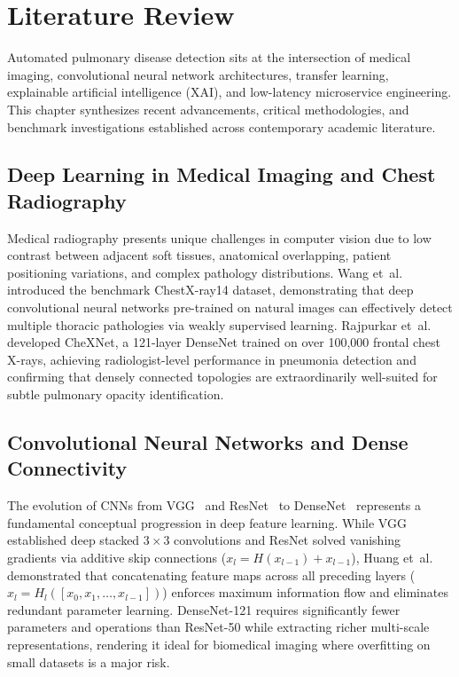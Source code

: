 \documentclass[12pt,a4paper]{report}
\begin{document}
\chapter{Literature Review}

Automated pulmonary disease detection sits at the intersection of medical imaging, convolutional neural network architectures, transfer learning, explainable artificial intelligence (XAI), and low-latency microservice engineering. This chapter synthesizes recent advancements, critical methodologies, and benchmark investigations established across contemporary academic literature.

\section{Deep Learning in Medical Imaging and Chest Radiography}
Medical radiography presents unique challenges in computer vision due to low contrast between adjacent soft tissues, anatomical overlapping, patient positioning variations, and complex pathology distributions. Wang et~al.~\cite{ref_wang2017_chestxray14} introduced the benchmark ChestX-ray14 dataset, demonstrating that deep convolutional neural networks pre-trained on natural images can effectively detect multiple thoracic pathologies via weakly supervised learning. Rajpurkar et~al.~\cite{ref_rajpurkar2017_chexnet} developed CheXNet, a 121-layer DenseNet trained on over 100,000 frontal chest X-rays, achieving radiologist-level performance in pneumonia detection and confirming that densely connected topologies are extraordinarily well-suited for subtle pulmonary opacity identification.

\section{Convolutional Neural Networks and Dense Connectivity}
The evolution of CNNs from VGG~\cite{ref_simonyan2014_vgg} and ResNet~\cite{ref_he2016_resnet} to DenseNet~\cite{ref_huang2017_densenet} represents a fundamental conceptual progression in deep feature learning. While VGG established deep stacked $3\times 3$ convolutions and ResNet solved vanishing gradients via additive skip connections ($x_l = H(x_{l-1}) + x_{l-1}$), Huang et~al.~\cite{ref_huang2017_densenet} demonstrated that concatenating feature maps across all preceding layers ($x_l = H_l([x_0, x_1, \dots, x_{l-1}])$) enforces maximum information flow and eliminates redundant parameter learning. DenseNet-121 requires significantly fewer parameters and operations than ResNet-50 while extracting richer multi-scale representations, rendering it ideal for biomedical imaging where overfitting on small datasets is a major risk.
\end{document}
